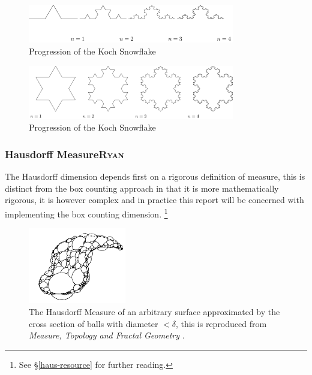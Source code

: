 \documentclass[a4paper,11pt,twoside]{article}
\begin{document}
\begin{figure}[htbp]
\centering
\includegraphics[width=9cm]{media/tikz/Koch_line.png}
\caption{\label{koch-line}Progression of the Koch Snowflake}
\end{figure}

\begin{figure}[htbp]
\centering
\includegraphics[width=9cm]{media/tikz/Snowflake.png}
\caption{\label{koch-snowflake}Progression of the Koch Snowflake}
\end{figure}

\subsubsection{Hausdorff Measure\hfill{}\textsc{Ryan}}
\label{hausdorff-measure}
The Hausdorff dimension depends first on a rigorous definition of measure, this is distinct from the box counting approach in that it is more mathematically rigorous, it is however complex and in practice this report will be concerned with implementing the box counting dimension. \footnote{See \S \ref{haus-resource} for further reading.}

\begin{figure}
\centering
\includegraphics[width=0.38\textwidth]{media/edgar_181_of_292.png}
\caption{\label{fig:ball-covering}The Hausdorff Measure of an arbitrary surface approximated by the cross section of balls with diameter \(< \delta\), this is reproduced from \emph{Measure, Topology and Fractal Geometry} \cite[p. 166]{edgarMeasureTopologyFractal2008a}.}
\end{figure}
\end{document}
